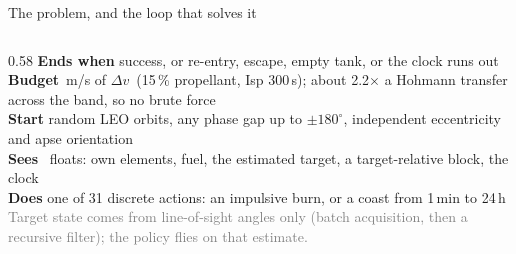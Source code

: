 \documentclass[aspectratio=169,11pt]{beamer}
\newcommand{\dv}{\ensuremath{\Delta v}}
\newcommand{\nObs}{38}
\begin{document}
\begin{frame}{The problem, and the loop that solves it}
\begin{columns}[T]
\begin{column}{0.58\textwidth}
\textbf{Ends when} \; success, or re-entry, escape, empty tank, or the clock runs out\\[1mm]
\textbf{Budget} \,m/s of \dv\ (15\,\% propellant, Isp 300\,s); about 2.2$\times$ a Hohmann transfer across the band, so no brute force\\[1mm]
\textbf{Start} \; random LEO orbits, any phase gap up to $\pm180^\circ$, independent eccentricity and apse orientation\\[1mm]
\textbf{Sees} \; \nObs\ floats: own elements, fuel, the estimated target, a target-relative block, the clock\\[1mm]
\textbf{Does} \; one of 31 discrete actions: an impulsive burn, or a coast from 1\,min to 24\,h\\[1mm]
{\scriptsize\textcolor{grey}{Target state comes from line-of-sight angles only (batch acquisition, then a recursive filter); the policy flies on that estimate.}}
\end{column}
\end{columns}
\end{frame}
\end{document}
